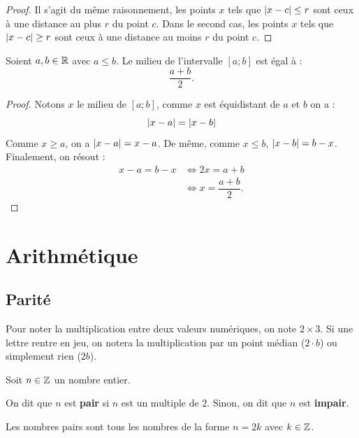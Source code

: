 \documentclass[a4paper, 12pt]{report}
\begin{document}
\begin{proof}
Il s'agit du même raisonnement, les points $x$ tels que $\lvert x-c\rvert \leq r$ sont ceux à une distance au plus $r$ du point $c$. 
Dans le second cas, les points $x$ tels que $\lvert x-c\rvert \geq r$ sont ceux à une distance au moins $r$ du point $c$. 
\end{proof}

\begin{prop}
Soient $a, b \in \mathbb{R}$ avec $a \leq b$. Le milieu de l'intervalle $[a ; b]$ est égal à :
\[ \dfrac{a+b}2. \] 
\end{prop}

\begin{proof}
Notons $x$ le milieu de $[a ; b]$, comme $x$ est équidistant de $a$ et $b$ on a :
\[ \lvert x-a\rvert = \lvert x-b\rvert \]
Comme $x \geq a$, on a $\lvert x - a\rvert = x-a $. \newline
De même, comme $x \leq b$, $\lvert x-b\rvert = b - x$. \newline
Finalement, on résout :
\begin{align*}
x-a = b-x & \iff 2x = a + b \\
& \iff x = \dfrac{a+b}2.
\end{align*}

\end{proof}

\chapter{Arithmétique}

\section{Parité}

\begin{nota}
Pour noter la multiplication entre deux valeurs numériques, on note $2\times3$.
Si une lettre rentre en jeu, on notera la multiplication par un point médian ($2\cdot b$) ou simplement rien ($2b$).
\end{nota}

\begin{defn}
Soit $n\in\mathbb{Z}$ un nombre entier.
	
On dit que $n$ est \textbf{pair} si $n$ est un multiple de 2.
Sinon, on dit que $n$ est \textbf{impair}.
\end{defn}

\begin{rmq}
Les nombres pairs sont tous les nombres de la forme $n = 2k$ avec $k \in \mathbb{Z}$. 
\end{rmq}
\end{document}
